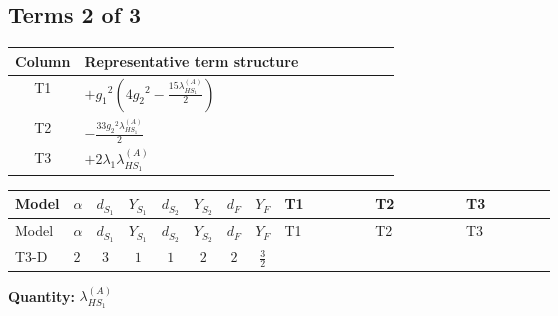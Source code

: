 \documentclass[8pt]{article}
\begin{document}
\begin{landscape}
\subsection*{Terms 2 of 3}
\begin{center}
\begin{tabular}{@{}c >{\raggedright\arraybackslash}p{0.82\linewidth}@{}}
\toprule
Column & Representative term structure \\
\midrule
T1 & \(\displaystyle +{g_1}^2 \left(4 {g_2}^2-\frac{15 {\lambda_{HS_1}^{(A)}}}{2}\right)\) \\
\midrule
T2 & \(\displaystyle -\frac{33 {g_2}^2 {\lambda_{HS_1}^{(A)}}}{2}\) \\
\midrule
T3 & \(\displaystyle +2 {\lambda_1} {\lambda_{HS_1}^{(A)}}\) \\
\midrule
\bottomrule
\end{tabular}
\end{center}
\smallskip
\tiny
\begin{longtable}{@{}llcccccc >{\raggedright\arraybackslash}p{0.21\linewidth} >{\raggedright\arraybackslash}p{0.21\linewidth} >{\raggedright\arraybackslash}p{0.21\linewidth}@{}}
\toprule
Model & $\alpha$ & $d_{S_1}$ & $Y_{S_1}$ & $d_{S_2}$ & $Y_{S_2}$ & $d_F$ & $Y_F$ & T1 & T2 & T3 \\
\midrule
\endfirsthead
\toprule
Model & $\alpha$ & $d_{S_1}$ & $Y_{S_1}$ & $d_{S_2}$ & $Y_{S_2}$ & $d_F$ & $Y_F$ & T1 & T2 & T3 \\
\midrule
\endhead
T3-D & $2$ & $3$ & $1$ & $1$ & $2$ & $2$ & $\frac{3}{2}$ & \scriptsize\adjustbox{max width=\linewidth}{$\begin{gathered} +{g_1}^2 \left(4 {g_2}^2-\frac{15 {\lambda_{HS_1}^{(A)}}}{2}\right)\end{gathered}$} & \scriptsize\adjustbox{max width=\linewidth}{$\begin{gathered} -\frac{33 {g_2}^2 {\lambda_{HS_1}^{(A)}}}{2}\end{gathered}$} & \scriptsize\adjustbox{max width=\linewidth}{$\begin{gathered} +2 {\lambda_1} {\lambda_{HS_1}^{(A)}}\end{gathered}$} \\
\midrule
\bottomrule
\end{longtable}
\clearpage
\noindent\textbf{Quantity: }$\lambda_{HS_1}^{(A)}$\par\smallskip

\end{landscape}
\end{document}
